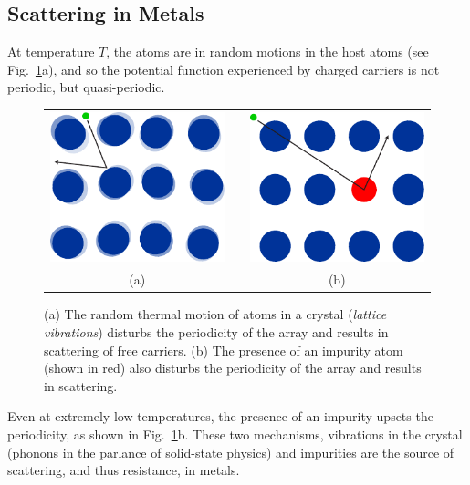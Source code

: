 \subsection{Scattering in Metals}
At temperature $T$, the atoms are in random motions in the host atoms (see Fig.~\ref{fig:slide16}a), and so the potential function experienced by charged carriers is not periodic, but quasi-periodic. 
\begin{figure}
\begin{center}
\begin{tabular}{ccc}
\includegraphics[width=.3\columnwidth]{lattice_vibrate} &
\hspace{.15\columnwidth} &
\includegraphics[width=.3\columnwidth]{lattice_impurity} \\
(a) & & (b) \\
\end{tabular}
\end{center}
\caption{(a) The random thermal motion of atoms in a crystal (\emph{lattice vibrations}) disturbs the periodicity of the array and results in scattering of free carriers.  (b) The presence of an impurity atom (shown in red) also disturbs the periodicity of the array and results in scattering.   } \label{fig:slide16}
\end{figure}

Even at extremely low temperatures, the presence of an impurity upsets the periodicity, as shown in Fig.~\ref{fig:slide16}b.  These two mechanisms, vibrations in the crystal (phonons in the parlance of solid-state physics) and impurities are the source of scattering, and thus resistance, in metals.

